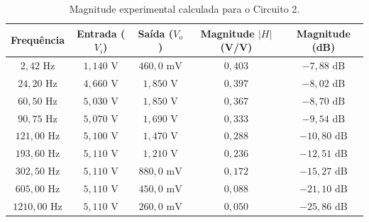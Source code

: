 \begin{table}[H]
	\centering
	\caption{Magnitude experimental calculada para o Circuito 2.}
	\label{tab:mag_c2}
	\renewcommand{\arraystretch}{1.2}
	\begin{tabular}{ccccc}
		\hline
		\textbf{Frequência} & \textbf{Entrada ($V_i$)} & \textbf{Saída ($V_o$)} & \textbf{Magnitude $|H|$ (V/V)} & \textbf{Magnitude (dB)} \\ \hline
		$2,42\text{ Hz}$ & $1,140\text{ V}$ & $460,0\text{ mV}$ & $0,403$ & $-7,88\text{ dB}$ \\
		$24,20\text{ Hz}$ & $4,660\text{ V}$ & $1,850\text{ V}$ & $0,397$ & $-8,02\text{ dB}$ \\
		$60,50\text{ Hz}$ & $5,030\text{ V}$ & $1,850\text{ V}$ & $0,367$ & $-8,70\text{ dB}$ \\
		$90,75\text{ Hz}$ & $5,070\text{ V}$ & $1,690\text{ V}$ & $0,333$ & $-9,54\text{ dB}$ \\
		$121,00\text{ Hz}$ & $5,100\text{ V}$ & $1,470\text{ V}$ & $0,288$ & $-10,80\text{ dB}$ \\
		$193,60\text{ Hz}$ & $5,110\text{ V}$ & $1,210\text{ V}$ & $0,236$ & $-12,51\text{ dB}$ \\
		$302,50\text{ Hz}$ & $5,110\text{ V}$ & $880,0\text{ mV}$ & $0,172$ & $-15,27\text{ dB}$ \\
		$605,00\text{ Hz}$ & $5,110\text{ V}$ & $450,0\text{ mV}$ & $0,088$ & $-21,10\text{ dB}$ \\
		$1210,00\text{ Hz}$ & $5,110\text{ V}$ & $260,0\text{ mV}$ & $0,050$ & $-25,86\text{ dB}$ \\ \hline
	\end{tabular}
\end{table}

